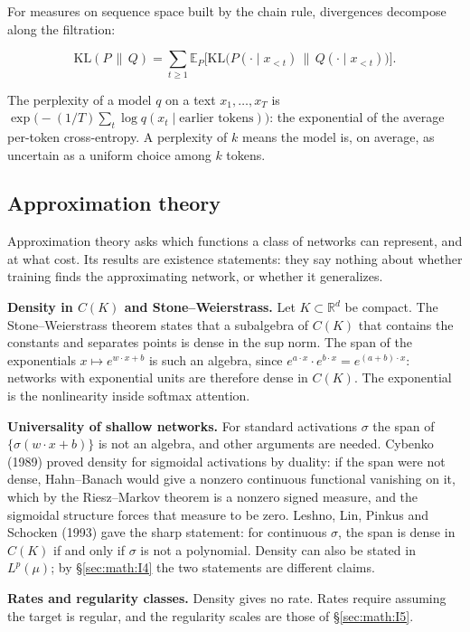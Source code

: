 For measures on sequence space built by the chain rule, divergences
decompose along the filtration:

\[
\mathrm{KL}(P \,\|\, Q) = \sum_{t \ge 1} \mathbb{E}_P\Big[\mathrm{KL}\big(P(\cdot \mid x_{<t}) \,\big\|\, Q(\cdot \mid x_{<t})\big)\Big].
\]

The perplexity of a model \(q\) on a text \(x_{1}, \ldots, x_T\) is
\(\exp\bigl(-(1/T) \sum_{t} \log q(x_{t} \mid \text{earlier tokens})\bigr)\): the
exponential of the average per-token cross-entropy. A perplexity of \(k\)
means the model is, on average, as uncertain as a uniform choice among \(k\)
tokens.

\subsection{Approximation theory}\label{sec:math:I11}

Approximation theory asks which functions a class of networks can
represent, and at what cost. Its results are existence statements: they
say nothing about whether training finds the approximating network, or
whether it generalizes.

\textbf{Density in \(C(K)\) and Stone--Weierstrass.} Let \(K \subset
\mathbb{R}^{d}\) be compact. The Stone--Weierstrass theorem states
that a subalgebra of \(C(K)\) that contains the constants and separates
points is dense in the sup norm. The span of the exponentials \(x \mapsto
e^{w\cdot x + b}\) is such an algebra, since \(e^{a\cdot x}\cdot e^{b\cdot x}
= e^{(a+b)\cdot x}\): networks with exponential units are therefore dense in
\(C(K)\). The exponential is the nonlinearity inside softmax attention.

\textbf{Universality of shallow networks.} For standard activations \(\sigma\)
the span of \(\{\sigma(w\cdot x + b)\}\) is not an algebra, and other arguments are
needed. Cybenko (1989) proved density for sigmoidal activations by
duality: if the span were not dense, Hahn--Banach would give a nonzero
continuous functional vanishing on it, which by the Riesz--Markov
theorem is a nonzero signed measure, and the sigmoidal structure forces
that measure to be zero. Leshno, Lin, Pinkus and Schocken (1993) gave
the sharp statement: for continuous \(\sigma\), the span is dense in \(C(K)\) if and
only if \(\sigma\) is not a polynomial. Density can also be stated in \(L^p(\mu)\);
by \S\ref{sec:math:I4} the two statements are different claims.

\textbf{Rates and regularity classes.} Density gives no rate. Rates
require assuming the target is regular, and the regularity scales are
those of \S\ref{sec:math:I5}.

